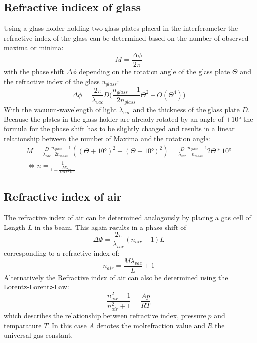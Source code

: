 \subsection{Refractive indicex of glass}
Using a glass holder holding two glass plates placed in the interferometer the refractive index of the glass can be determined based on the number of observed maxima or minima:
\begin{equation*}
M=\frac{\Delta \phi}{2\pi}
\end{equation*}
with the phase shift $\Delta \phi$ depending on the rotation angle of the glass plate $\Theta$ and the refractive index of the glass $n_{glass}$:
\begin{equation}
\Delta \phi=\frac{2\pi}{\lambda_{vac}}D\bigl( \frac{n_{glass}-1}{2n_{glass}}\Theta^2+O(\Theta^4)\bigr)
\end{equation}
With the vacuum-wavelength of light $\lambda_{vac}$ and the thickness of the glass plate $D$. Because the plates in the glass holder are already rotated by an angle of $\pm10°$ the formula for the phase shift has to be slightly changed and results in a linear relationship between the number of Maxima and the rotation angle:
\begin{gather}
M=\frac{D}{\lambda_{vac}}\frac{n_{glass}-1}{2n_{glass}}((\Theta+10°)^2-(\Theta-10°)^2)=\frac{D}{\lambda_{vac}}\frac{n_{glass}-1}{n_{glass}}2\Theta*10° \\
\iff n=\frac{1}{1-\frac{M\lambda_{vac}}{D2\Theta*10°}}
\end{gather}
\subsection{Refractive index of air}
The refractive index of air can be determined analogously by placing a gas cell of Length $L$ in the beam. This again results in a phase shift of
\begin{equation*}
\Delta \Phi=\frac{2\pi}{\lambda_{vac}}(n_{air}-1)L
\end{equation*}
corresponding to a refractive index of:
\begin{equation}
n_{air}=\frac{M\lambda_{vac}}{L}+1
\end{equation}
Alternatively the Refractive index of air can also be determined using the Lorentz-Lorentz-Law:
\begin{equation}
\frac{n_{air}^2-1}{n_{air}^2+1}=\frac{Ap}{RT}
\end{equation}
which describes the relationship between refractive index, pressure $p$ and temparature $T$. In this case $A$ denotes the molrefraction value and $R$ the universal gas constant.
\cite{sample}
